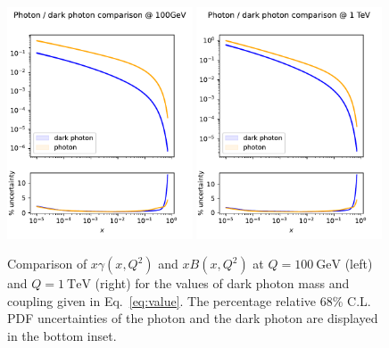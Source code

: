 \documentclass[withindex,glossary]{cam-thesis}
\newcommand{\JM}[1]{{\bf\color{cyan}JM: #1}}
\begin{document}
\begin{figure}[hbt]
\centering
\includegraphics[width=0.49\textwidth]{darkphoton_figures/vhigh_dark_photon_comparison_100GeV.pdf}
\includegraphics[width=0.49\textwidth]{darkphoton_figures/vhigh_dark_photon_comparison_1TeV.pdf}
\caption{Comparison of $x\gamma(x,Q^2)$ and $xB(x,Q^2)$ at $Q=100\ \text{GeV}$ (left) and $Q=1\ \text{TeV}$ (right)
for the values of dark photon mass and coupling given in
Eq.~\eqref{eq:value}. The percentage relative 68\% C.L. PDF
uncertainties of the photon and the dark photon are
  displayed in the bottom inset.}
\label{fig:dark_pdfs}
\end{figure}
\end{document}
